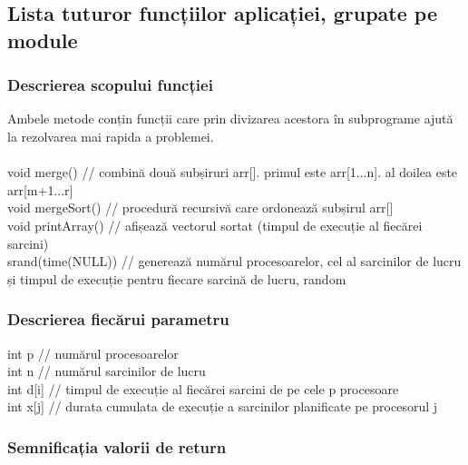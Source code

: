 \documentclass{article}
\begin{document}
\subsection{Lista tuturor funcțiilor aplicației, grupate pe module}

\subsubsection{Descrierea scopului funcției}

Ambele metode conțin funcții care prin divizarea acestora în subprograme ajută la rezolvarea mai rapida a problemei.\\ 
\\
void merge()  \hspace{1cm}// combină două subșiruri arr[]. primul este arr[1...n]. al doilea este arr[m+1...r]\\
void mergeSort() \hspace{1cm} // procedură recursivă care ordonează subșirul arr[] \\
void printArray()  \hspace{1cm}// afișează vectorul sortat (timpul de execuție al fiecărei sarcini)\\
srand(time(NULL)) \hspace{1cm}// generează numărul procesoarelor, cel al sarcinilor de lucru și timpul de execuție pentru fiecare sarcină de lucru, random \\

\subsubsection{Descrierea fiecărui parametru}

 int p  \hspace{1cm} //  numărul procesoarelor \\
 int n \hspace{1cm} //  numărul sarcinilor de lucru \\
 int d[i] \hspace{1cm} // timpul de execuție al fiecărei sarcini de pe cele p procesoare \\
 int x[j] \hspace{1cm}// durata cumulata de execuție a sarcinilor planificate pe procesorul j \\
 
 
\subsubsection{Semnificația valorii de return}
\end{document}
